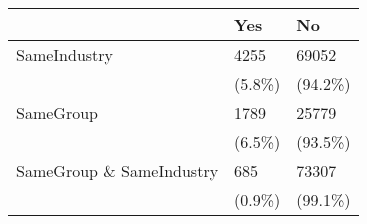 \begin{tabular}{lll}
\toprule
{} &     Yes &       No \\
\midrule
SameIndustry             &    4255 &    69052 \\
                         &  (5.8\%) &  (94.2\%) \\
SameGroup                &    1789 &    25779 \\
                         &  (6.5\%) &  (93.5\%) \\
SameGroup \& SameIndustry &     685 &    73307 \\
                         &  (0.9\%) &  (99.1\%) \\
\bottomrule
\end{tabular}
